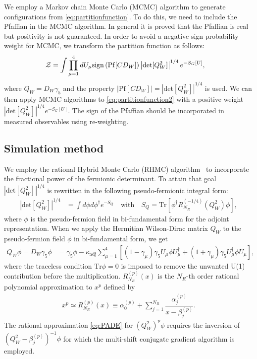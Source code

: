 \documentclass[a4paper,11pt]{article}
\begin{document}
We employ a Markov chain Monte Carlo (MCMC) algorithm to generate configurations from \eqref{eq:partitionfunction}.
To do this, we need to include the Pfaffian in the MCMC algorithm.
In general it is proved that the Pfaffian is real but  positivity is not guaranteed.
In order to avoid a negative sign probability weight for MCMC, we transform the partition function as follows:
\begin{align}
  {\cal Z}
  &=\int \prod_{\mu=1}^{4} dU_{\mu}\mathrm{sign}\left(\mathrm{Pf}[CD_W]\right) \left|\mathrm{det}[Q_W^2]\right|^{1/4}e^{-S_G[U]},
             \label{eq:partitionfunction2}
\end{align}
where $Q_W = D_W\gamma_5$ and the property $\left|\mathrm{Pf}[CD_W]\right|=\left|\mathrm{det}[Q_W^2]\right|^{1/4}$ is used.
We can then apply MCMC algorithms to \eqref{eq:partitionfunction2} with a positive weight
$\left|\mathrm{det}[Q_W^2]\right|^{1/4}e^{-S_G[U]}$. The sign of the Pfaffian should be incorporated in measured observables
using re-weighting.


\subsection{Simulation method}
We employ the rational Hybrid Monte Carlo (RHMC) algorithm~\cite{Kennedy:1998cu,Clark:2003na} to
incorporate the fractional power of the fermionic determinant. 
To attain that goal $\left|\mathrm{det}[Q_W^2]\right|^{1/4}$  is rewritten in the following pseudo-fermionic integral form:
\begin{align}
  \left|\mathrm{det}[Q_W^2]\right|^{1/4}& =\int d\phi d\phi^{\dag} e^{-S_Q}\quad \mbox{with} \quad
  S_Q = \mathrm{Tr}\left[\phi^{\dag} R_{N_R}^{(-1/4)}(Q_W^2) \phi\right],
\end{align}
where $\phi$ is the pseudo-fermion field in bi-fundamental form for the adjoint representation.
When we apply the Hermitian Wilson-Dirac matrix $Q_W$ to the pseudo-fermion field $\phi$ in bi-fundamental form,
we get 
\begin{align}
  Q_W \phi = D_W \gamma_5 \phi&= \gamma_5 \phi -
             \kappa_{\mathrm{adj}}\sum_{\mu=1}^{4}\left[ (1-\gamma_{\mu})\gamma_5 U_{\mu}\phi U_{\mu}^{\dag}
             + (1+\gamma_\mu)\gamma_5 U_{\mu}^{\dag}\phi U_{\mu}\right],
  \label{eq:AdjQWbifmatrix}
\end{align}
where the traceless condition $\mathrm{Tr}\phi = 0$ is imposed to remove the unwanted U(1) contribution  before the multiplication.
$R_{N_R}^{(p)}(x)$ is the $N_R$-th order rational polynomial approximation to $x^{p}$ defined by 
\begin{align}
  x^{p} \simeq R_{N_R}^{(p)}(x) \equiv \alpha^{(p)}_0 + \sum_{j=1}^{N_R}\dfrac{\alpha_j^{(p)}}{x-\beta_j^{(p)}}.
  \label{eq:PADE}
\end{align}
The rational approximation \eqref{eq:PADE} for $(Q_W^2)^p\phi$ requires the inversion of
$(Q_W^2 - \beta^{(p)}_j)^{-1}\phi$ for which the multi-shift conjugate gradient algorithm is employed.
\end{document}
